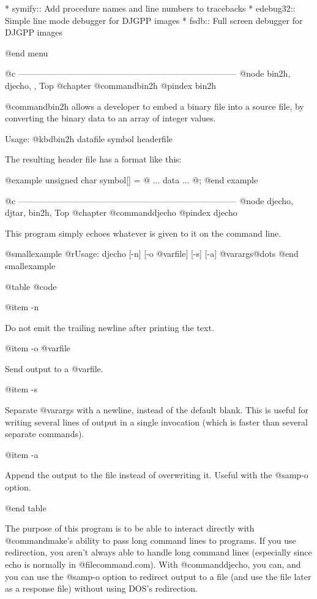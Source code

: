 * symify::      Add procedure names and line numbers to tracebacks
* edebug32::    Simple line mode debugger for DJGPP images
* fsdb::        Full screen debugger for DJGPP images

@end menu

@c -----------------------------------------------------------------------------
@node bin2h, djecho, , Top
@chapter @command{bin2h}
@pindex bin2h

@command{bin2h} allows a developer to embed a binary file into a source
file, by converting the binary data to an array of integer values.

Usage: @kbd{bin2h datafile symbol headerfile}

The resulting header file has a format like this:

@example
unsigned char symbol[] = @{
  ... data ...
@};
@end example

@c -----------------------------------------------------------------------------
@node djecho, djtar, bin2h, Top
@chapter @command{djecho}
@pindex djecho

This program simply echoes whatever is given to it on the command line.

@smallexample
 @r{Usage:} djecho [-n] [-o @var{file}] [-s] [-a] @var{args}@dots{}
@end smallexample

@table @code

@item -n

Do not emit the trailing newline after printing the text.

@item -o @var{file}

Send output to a @var{file}.

@item -s

Separate @var{args} with a newline, instead of the default blank.  This
is useful for writing several lines of output in a single invocation
(which is faster than several separate commands).

@item -a

Append the output to the file instead of overwriting it.  Useful with
the @samp{-o} option.

@end table

The purpose of this program is to be able to interact directly with
@command{make}'s ability to pass long command lines to programs.  If you
use redirection, you aren't always able to handle long command lines
(especially since echo is normally in @file{command.com}).  With
@command{djecho}, you can, and you can use the @samp{-o} option to redirect
output to a file (and use the file later as a response file) without
using DOS's redirection.

